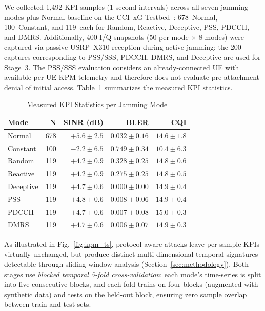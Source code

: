 \documentclass[conference]{IEEEtran}
\begin{document}
We collected 1,492 KPI samples (1-second intervals) across all seven jamming modes plus Normal baseline on the CCI~xG Testbed~\cite{dasilva2025}: 678~Normal, 100~Constant, and 119~each for Random, Reactive, Deceptive, PSS, PDCCH, and DMRS. Additionally, 400 I/Q snapshots (50 per mode $\times$ 8 modes) were captured via passive USRP~X310 reception during active jamming; the 200 captures corresponding to PSS/SSS, PDCCH, DMRS, and Deceptive are used for Stage~3. The PSS/SSS evaluation considers an already-connected UE with available per-UE KPM telemetry and therefore does not evaluate pre-attachment denial of initial access. Table~\ref{tab:kpm_stats} summarizes the measured KPI statistics.

\begin{table}[t]
\centering
\caption{Measured KPI Statistics per Jamming Mode}
\label{tab:kpm_stats}
\small
\setlength{\tabcolsep}{3pt}
\begin{tabular}{lrrrr}
\toprule
Mode & N & SINR (dB) & BLER & CQI \\
\midrule
Normal & 678 & $+5.6 \pm 2.5$ & $0.032 \pm 0.16$ & $14.6 \pm 1.8$ \\
Constant & 100 & $-2.2 \pm 6.5$ & $0.749 \pm 0.34$ & $10.4 \pm 6.3$ \\
Random & 119 & $+4.2 \pm 0.9$ & $0.328 \pm 0.25$ & $14.8 \pm 0.6$ \\
Reactive & 119 & $+4.2 \pm 0.9$ & $0.275 \pm 0.25$ & $14.8 \pm 0.5$ \\
Deceptive & 119 & $+4.7 \pm 0.6$ & $0.000 \pm 0.00$ & $14.9 \pm 0.4$ \\
PSS & 119 & $+4.8 \pm 0.6$ & $0.008 \pm 0.06$ & $14.9 \pm 0.4$ \\
PDCCH & 119 & $+4.7 \pm 0.6$ & $0.007 \pm 0.08$ & $15.0 \pm 0.3$ \\
DMRS & 119 & $+4.7 \pm 0.6$ & $0.006 \pm 0.07$ & $14.9 \pm 0.3$ \\
\bottomrule
\end{tabular}
\end{table}

As illustrated in Fig.~\ref{fig:kpm_ts}, protocol-aware attacks leave per-sample KPIs virtually unchanged, but produce distinct multi-dimensional temporal signatures detectable through sliding-window analysis (Section~\ref{sec:methodology}). Both stages use \textit{blocked temporal 5-fold cross-validation}: each mode's time-series is split into five consecutive blocks, and each fold trains on four blocks (augmented with synthetic data) and tests on the held-out block, ensuring zero sample overlap between train and test sets.
\end{document}
